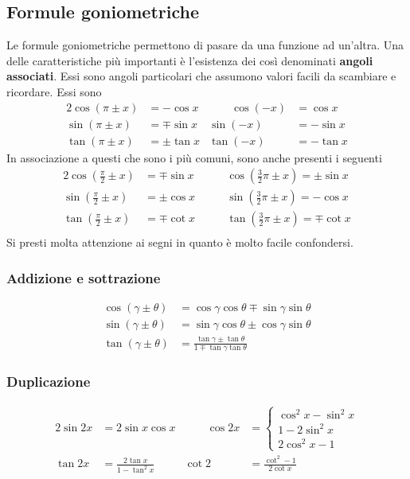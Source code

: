 \subsection{Formule goniometriche}
Le formule goniometriche permettono di pasare da una funzione ad un'altra. Una delle caratteristiche 
più importanti è l'esistenza dei così denominati \textbf{angoli associati}. Essi sono angoli 
particolari che assumono valori facili da scambiare e ricordare. Essi sono
\begin{alignat*}{2}
  \cos(\pi\pm x) & = -\cos x &\qquad \cos(-x) &= \cos x\\
  \sin(\pi\pm x) &= \mp\sin x & \sin(-x) &= -\sin x\\
  \tan(\pi\pm x) &= \pm\tan x & \tan(-x) &= -\tan x
\end{alignat*}
In associazione a questi che sono i più comuni, sono anche presenti i seguenti
\begin{alignat*}{2}
  \cos\left(\frac{\pi}{2}\pm x\right) &= \mp\sin x &\qquad \cos\left(\frac{3}{2}\pi\pm x\right) = 
  \pm\sin x\\
  \sin\left(\frac{\pi}{2}\pm x\right) &= \pm\cos x &\qquad \sin\left(\frac{3}{2}\pi\pm x\right) = 
  -\cos x\\
  \tan\left(\frac{\pi}{2}\pm x\right) &= \mp\cot x &\qquad \tan\left(\frac{3}{2}\pi\pm x\right) = 
  \mp\cot x\\
\end{alignat*}
Si presti molta attenzione ai segni in quanto è molto facile confondersi.

\subsubsection{Addizione e sottrazione}
\begin{align*}
  \cos(\gamma\pm\theta) &= \cos\gamma\cos\theta\mp\sin\gamma\sin\theta\\
  \sin(\gamma\pm\theta) &= \sin\gamma\cos\theta\pm\cos\gamma\sin\theta\\
  \tan(\gamma\pm\theta) &= \frac{\tan\gamma\pm\tan\theta}{1\mp\tan\gamma\tan\theta}
\end{align*}

\subsubsection{Duplicazione}
\begin{alignat*}{2}
  \sin2x & =2\sin x\cos x &\qquad \cos2x &= \begin{cases}
    \cos^2x - \sin^2x\\
    1-2\sin^2x\\
    2\cos^2x-1
  \end{cases}\\
  \tan2x &= \frac{2\tan x}{1-\tan^2x} & \cot2 &= \frac{\cot^2-1}{2\cot x}
\end{alignat*}

